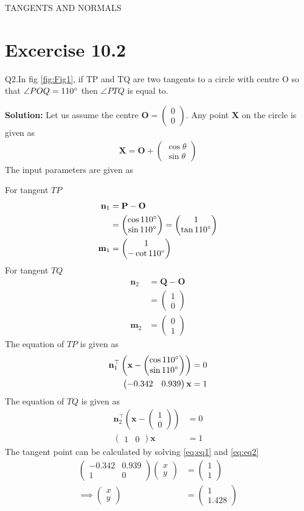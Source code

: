 \documentclass[12pt]{article}
\providecommand{\brak}[1]{\ensuremath{\left(#1\right)}}
\newcommand{\solution}{\noindent \textbf{Solution: }}
\newcommand{\myvec}[1]{\ensuremath{\begin{pmatrix}#1\end{pmatrix}}}
\let\vec\mathbf
\begin{document}
\begin{center}
\textbf\large{TANGENTS AND NORMALS}

\end{center}
\section*{Excercise 10.2}
Q2.In fig \ref{fig:Fig1}, if TP and TQ are two tangents to a circle with centre O so that $\angle{POQ} = 110\degree$ then $\angle{PTQ}$ is equal to.

\solution
Let us assume the centre $\vec{O} = \myvec{0\\0}$. Any point $\vec{X}$ on the circle is given as
\begin{align}
	\vec{X} = \vec{O}+\myvec{\cos\theta\\\sin\theta}
\end{align}
The input parameters are given as

For tangent $TP$
\begin{align}
	\vec{n}_1 &= \vec{P}-\vec{O}\\
	&= \myvec{\cos{110}\degree\\\sin{110}\degree} =  \myvec{1\\\tan{110}\degree}\\
	\vec{m}_1 &= \myvec{1\\-\cot{110}\degree}
\end{align}
For tangent $TQ$
\begin{align}
	\vec{n}_2 &= \vec{Q}-\vec{O}\\
	&= \myvec{1\\0}\\
	\vec{m}_2 &= \myvec{0\\1}
\end{align}
The equation of $TP$ is given as
\begin{align}
	\vec{n}_1^\top\brak{\vec{x}-\myvec{\cos{110}\degree\\\sin{110}\degree}} &= 0\\
	\label{eq:eq1}
	\myvec{-0.342 & 0.939}\vec{x} &= 1
\end{align}
The equation of $TQ$ is given as
\begin{align}
	\vec{n}_2^\top\brak{\vec{x}-\myvec{1\\0}} &= 0\\
	\label{eq:eq2}
	\myvec{1&0}\vec{x} &= 1
\end{align}
The tangent point can be calculated by solving \eqref{eq:eq1} and \eqref{eq:eq2}
\begin{align}
	\myvec{-0.342&0.939\\1&0}\myvec{x\\y} &= \myvec{1\\1}\\
	\implies \myvec{x\\y} &= \myvec{1\\1.428}
\end{align}
\end{document}
